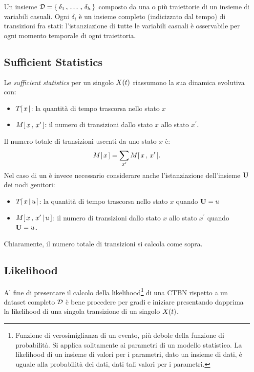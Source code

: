\begin{definizione}
\label{defn:dataset-completo}
Un insieme $\mathcal{D}=\{\,\delta_1\,,\,\dotsc\,,\,\delta_h\,\}$ composto da una o più traiettorie di un insieme di variabili casuali. Ogni $\delta_i$ è un insieme completo (indicizzato dal tempo) di transizioni fra stati: l'istanziazione di tutte le variabili casuali è osservabile per ogni momento temporale di ogni traiettoria.
\end{definizione}

\subsection{Sufficient Statistics}
\label{sec:ctbn-sufficient-stats}
Le \emph{sufficient statistics} per un singolo \homm\mprocess{} $\mathnormal{X}(t)$ riassumono la sua dinamica evolutiva con:
\begin{itemize}
    \item $T[\,x\,]$: la quantità di tempo trascorsa nello stato $x$
    \item $\mstat[x]{x^\prime}$: il numero di transizioni dallo stato $x$ allo stato $x^\prime$.
\end{itemize}

Il numero totale di transizioni uscenti da uno stato $x$ è:
\[
\mstat{x}=\sum_{x^\prime}\mstat[x]{x^\prime}\text{.}
\]
Nel caso di un \conm\mprocess{} è invece necessario considerare anche l'istanziazione dell'insieme $\mathbf{U}$ dei nodi genitori:
\begin{itemize}
    \item $T[\,x\,\arrowvert\,u\,]$: la quantità di tempo trascorsa nello stato $x$ quando $\mathbf{U}=u$
    \item $\mstat[x]{x^\prime\,\arrowvert\,u}$: il numero di transizioni dallo stato $x$ allo stato $x^\prime$ quando $\mathbf{U}=u$.
\end{itemize}
Chiaramente, il numero totale di transizioni si calcola come sopra.

\subsection{Likelihood}
\label{sec:ctbn-likelihood}
Al fine di presentare il calcolo della likelihood\footnote{Funzione di verosimiglianza di un evento, più debole della funzione di probabilità. Si applica solitamente ai parametri di un modello statistico. La likelihood di un insieme di valori per i parametri, dato un insieme di dati, è uguale alla probabilità dei dati, dati tali valori per i parametri.} di una \acs{CTBN} rispetto a un dataset completo $\mathcal{D}$ è bene procedere per gradi e iniziare presentando dapprima la likelihood di una singola transizione di un singolo \homm\mprocess{} $\mathnormal{X}(t)$.

